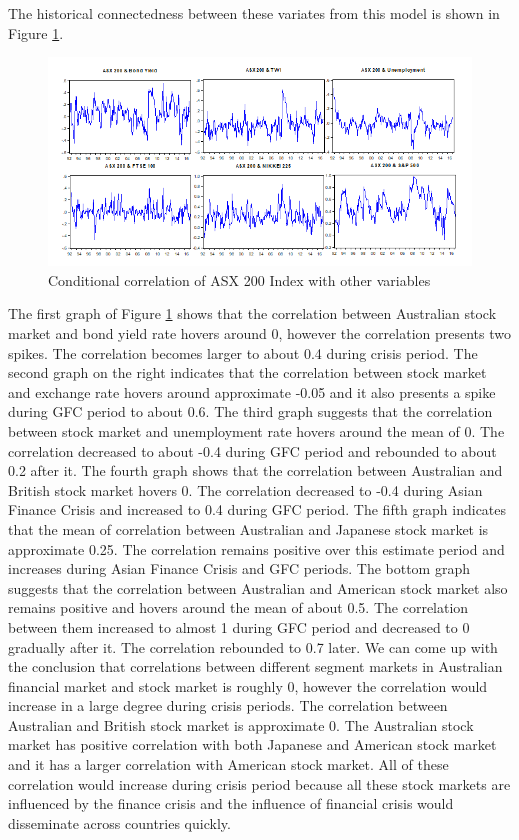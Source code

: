\documentclass[11pt]{article}
\begin{document}
The historical connectedness between these variates from this model is shown in Figure \ref{corr}.
\begin{figure}[h]
	\centering
	\includegraphics[width=\textwidth]{cor_asx.png}
	\caption{Conditional correlation of ASX 200 Index with other variables}
	\label{corr}	
\end{figure}
The first graph of Figure \ref{corr} shows that the correlation between Australian stock market and bond yield rate hovers around 0, however the correlation presents two spikes. The correlation becomes larger to about 0.4 during crisis period. The second graph on the right indicates that the correlation between stock market and exchange rate hovers around approximate -0.05 and it also presents a spike during GFC period to about 0.6. The third graph suggests that the correlation between stock market and unemployment rate hovers around the mean of 0. The correlation decreased to about -0.4 during GFC period and rebounded to about 0.2 after it. The fourth graph shows that the correlation between Australian and British stock market hovers 0. The correlation decreased to -0.4 during Asian Finance Crisis and increased to 0.4 during GFC period. The fifth graph indicates that the mean of correlation between Australian and Japanese stock market is approximate 0.25. The correlation remains positive over this estimate period and increases during Asian Finance Crisis and GFC periods. The bottom graph suggests that the correlation between Australian and American stock market also remains positive and hovers around the mean of about 0.5. The correlation between them increased to almost 1 during GFC period and decreased to 0 gradually after it. The correlation rebounded to 0.7 later.
We can come up with the conclusion that correlations between different segment markets in Australian financial market and stock market is roughly 0, however the correlation would increase in a large degree during crisis periods. The correlation between Australian and British stock market is approximate 0. The Australian stock market has positive correlation with both Japanese and American stock market and it has a larger correlation with American stock market. All of these correlation would increase during crisis period because all these stock markets are influenced by the finance crisis and the influence of financial crisis would disseminate across countries quickly.
 
\end{document}
